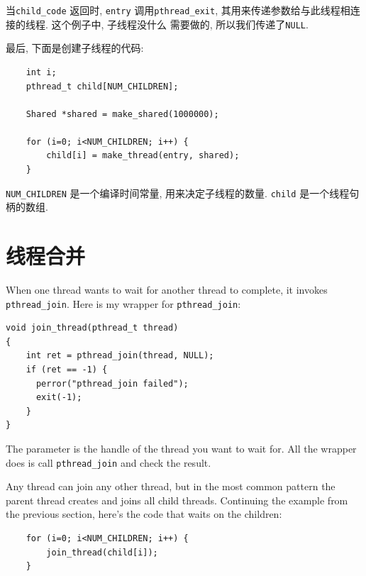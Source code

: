 \documentclass[12pt]{book}
\begin{document}
{%
当{\tt child\_code} 返回时,  {\tt entry} 调用\verb"pthread_exit", 
其用来传递参数给与此线程相连接的线程. 这个例子中, 子线程没什么
需要做的, 所以我们传递了{\tt NULL}.

最后, 下面是创建子线程的代码:

\begin{verbatim}
    int i;
    pthread_t child[NUM_CHILDREN];

    Shared *shared = make_shared(1000000);

    for (i=0; i<NUM_CHILDREN; i++) {
        child[i] = make_thread(entry, shared);
    }
\end{verbatim}

\verb"NUM_CHILDREN" 是一个编译时间常量, 用来决定子线程的数量. 
{\tt child} 是一个线程句柄的数组. 

\section{线程合并}

When one thread wants to wait for another thread to complete,
it invokes {\tt pthread\_join}.
Here is my wrapper for {\tt pthread\_join}:

\begin{verbatim}
void join_thread(pthread_t thread)
{
    int ret = pthread_join(thread, NULL);
    if (ret == -1) {
      perror("pthread_join failed");
      exit(-1);
    }
}
\end{verbatim}

The parameter is the handle of the thread you want to wait for.
All the wrapper does is call {\tt pthread\_join} and check the
result.

Any thread can join any other thread, but in the most common pattern
the parent thread creates and joins all child threads.
Continuing the example from the previous section, here's the
code that waits on the children:

\begin{verbatim}
    for (i=0; i<NUM_CHILDREN; i++) {
        join_thread(child[i]);
    }
\end{verbatim}

}
\end{document}
